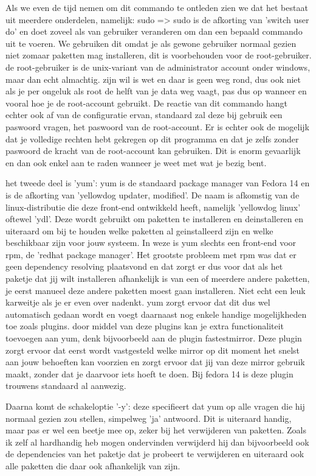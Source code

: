 Als we even de tijd nemen om dit commando te ontleden zien we dat het bestaat uit meerdere onderdelen, namelijk: sudo => sudo is de afkorting van 'switch user do' en doet zoveel als van gebruiker veranderen om dan een bepaald commando uit te voeren. We gebruiken dit omdat je als gewone gebruiker normaal gezien niet zomaar paketten mag installeren, dit is voorbehouden voor de root-gebruiker. de root-gebruiker is de unix-variant van de administrator account onder windows, maar dan echt almachtig. zijn wil is wet en daar is geen weg rond, dus ook niet als je per ongeluk als root de helft van je data weg vaagt, pas dus op wanneer en vooral hoe je de root-account gebruikt. De reactie van dit commando hangt echter ook af van de configuratie ervan, standaard zal deze bij gebruik een paswoord vragen, het paswoord van de root-account. Er is echter ook de mogelijk dat je volledige rechten hebt gekregen op dit programma en dat je zelfs zonder paswoord de kracht van de root-account kan gebruiken. Dit is enorm gevaarlijk en dan ook enkel aan te raden wanneer je weet met wat je bezig bent.

het tweede deel is 'yum': yum is de standaard package manager van Fedora 14 en is de afkorting van 'yellowdog updater, modified'. De naam is afkomstig van de linux-distributie die deze front-end ontwikkeld heeft, namelijk 'yellowdog linux' oftewel 'ydl'. Deze wordt gebruikt om paketten te installeren en deinstalleren en uiteraard om bij te houden welke paketten al geinstalleerd zijn en welke beschikbaar zijn voor jouw systeem. In weze is yum slechts een front-end voor rpm, de 'redhat package manager'. Het grootste probleem met rpm was dat er geen dependency resolving plaatsvond en dat zorgt er dus voor dat als het paketje dat jij wilt installeren afhankelijk is van een of meerdere andere paketten, je eerst manueel deze andere paketten moest gaan installeren. Niet  echt een leuk karweitje als je er even over nadenkt. yum zorgt ervoor dat dit dus wel automatisch gedaan wordt en voegt daarnaast nog enkele handige mogelijkheden toe zoals plugins. door middel van deze plugins kan je extra functionaliteit toevoegen aan yum, denk bijvoorbeeld aan de plugin fastestmirror. Deze plugin zorgt ervoor dat eerst wordt vastgesteld welke mirror op dit moment het snelst aan jouw behoeften kan voorzien en zorgt ervoor dat jij van deze mirror gebruik maakt, zonder dat je daarvoor iets hoeft te doen. Bij fedora 14 is deze plugin trouwens standaard al aanwezig.

Daarna komt de schakeloptie '-y': deze specifieert dat yum op alle vragen die hij normaal gezien zou stellen, simpelweg 'ja' antwoord. Dit is uiteraard handig, maar pas er wel een beetje mee op, zeker bij het verwijderen van paketten. Zoals ik zelf al hardhandig heb mogen ondervinden verwijderd hij dan bijvoorbeeld ook de dependencies van het paketje dat je probeert te verwijderen en uiteraard ook alle paketten die daar ook afhankelijk van zijn. 

